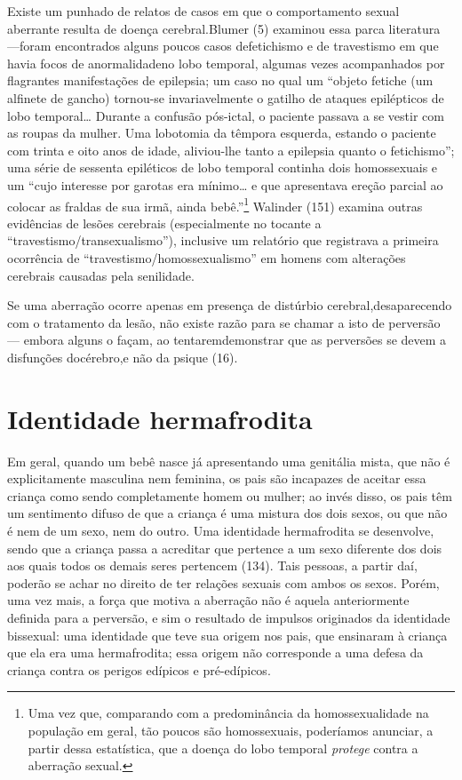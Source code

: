 Existe um punhado de relatos de casos em que o comportamento sexual
aberrante resulta de doença cerebral.\idxgenetvari[|(] Blumer\idxblumer{} (5) examinou essa parca
literatura ---\idxvariagene[|(] foram encontrados alguns poucos casos de\idxfeticlobo[|(] fetichismo\idxfetic{} e de
travestismo em que havia focos de anormalidade\idxcerea[|(] no lobo temporal,\idxcerebepil{}
algumas vezes acompanhados por flagrantes manifestações de epilepsia;
um caso no qual um ``objeto fetiche (um alfinete de gancho) tornou-se
invariavelmente o gatilho de ataques epilépticos de lobo temporal\ldots{}
Durante a confusão pós-ictal, o paciente passava a se vestir com as
roupas da mulher. Uma lobotomia da têmpora esquerda, estando o paciente
com trinta e oito anos de idade, aliviou-lhe tanto a epilepsia quanto o
fetichismo''; uma série de sessenta epiléticos de lobo temporal continha
dois homossexuais\idxhomosdeso{} e um ``cujo interesse por garotas era mínimo\ldots{} e que
apresentava ereção parcial ao colocar as fraldas de sua irmã, ainda
bebê.''\footnote{ Uma vez que, comparando com a predominância da
homossexualidade na população em geral, tão poucos são homossexuais,
poderíamos anunciar, a partir dessa estatística, que a doença do lobo
temporal \textit{protege} contra a aberração sexual.} Walinder (151)
examina outras evidências de lesões cerebrais (especialmente no tocante
a ``travestismo/transexualismo''),\idxtrave{} inclusive\idxtransecere{}
um relatório que registrava a primeira ocorrência de
``travestismo/homossexualismo'' em homens com alterações
cerebrais causadas pela senilidade.

Se uma aberração ocorre apenas em presença de distúrbio cerebral,\idxcerea[|)]
desaparecendo com o tratamento da lesão, não existe razão para se
chamar a isto de perversão --- embora alguns o façam, ao tentarem\idxfeticlobo[|)]
demonstrar que as perversões se devem a disfunções do\idxgenetvari[|)] cérebro,\idxvariagene[|)] e não da
psique (16).




\section{Identidade hermafrodita}

Em geral, quando um\idxherma{} bebê nasce\idxvariaherm{} já apresentando uma genitália mista,
que não é explicitamente masculina nem feminina, os pais são incapazes
de aceitar essa criança como sendo completamente homem ou mulher; ao
invés disso, os pais têm um sentimento difuso de que a criança é uma
mistura dos dois sexos, ou que não é nem de um sexo, nem do outro. Uma
identidade hermafrodita se desenvolve, sendo que a criança passa a
acreditar que pertence a um sexo diferente dos dois aos quais todos os
demais seres pertencem (134). Tais pessoas, a partir daí, poderão se
achar no direito de ter relações sexuais com ambos os sexos. Porém, uma
vez mais, a força que motiva a aberração não é aquela anteriormente
definida para a perversão, e sim o resultado de impulsos originados da
identidade bissexual: uma identidade que teve sua origem nos pais, que
ensinaram à criança que ela era uma hermafrodita; essa origem não
corresponde a uma defesa da criança contra os perigos edípicos e
pré-edípicos.


